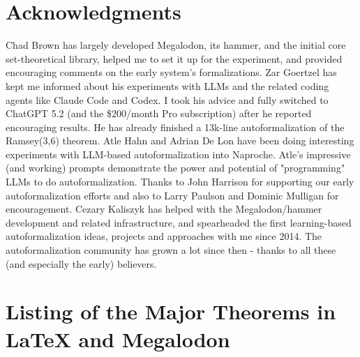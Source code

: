 \documentclass[a4paper,UKenglish,cleveref, autoref, thm-restate]{lipics-v2021}
\begin{document}
\section{Acknowledgments}
Chad Brown has largely developed Megalodon, its hammer, and the
initial core set-theoretical library, helped me to set it up for the
experiment, and provided encouraging comments on the early system's
formalizations. Zar Goertzel has kept me informed about his
experiments with LLMs and the related coding agents like Claude Code
and Codex. I took his advice and fully switched to ChatGPT 5.2 (and
the \$200/month Pro subscription) after he reported encouraging
results. He has already finished a 13k-line autoformalization of the
Ramsey(3,6) theorem. Atle Hahn and Adrian De Lon have been doing
interesting experiments with LLM-based autoformalization into
Naproche. Atle's impressive (and working) prompts demonstrate the
power and potential of "programming" LLMs to do
autoformalization.
Thanks to John Harrison for supporting our early autoformalization efforts and also to Larry Paulson and Dominic Mulligan for encouragement.
Cezary Kaliszyk has helped with the
Megalodon/hammer development and related infrastructure, and
spearheaded the first learning-based autoformalization ideas, projects
and approaches with me since 2014. 
The autoformalization community has
grown a lot since then - thanks to all these (and especially the
early) believers.


%

\appendix

\section{Listing of the Major Theorems in LaTeX and Megalodon}

%
%
%

%
%
%
\end{document}
